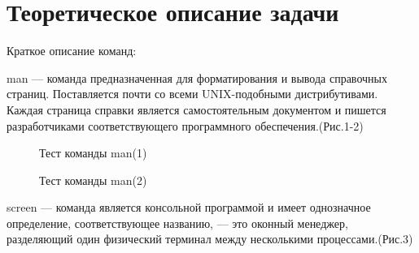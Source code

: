 \documentclass[a4paper,14pt]{extarticle}
\begin{document}
\section{Теоретическое описание задачи}
Краткое описание команд:

man — команда предназначенная для форматирования и вывода справочных страниц. Поставляется почти со всеми UNIX-подобными дистрибутивами. Каждая страница справки является самостоятельным документом и пишется разработчиками соответствующего программного обеспечения.(Рис.1-2)

\begin{figure}[h!]
\caption{Тест команды man(1)}
\label{fig:image}
\caption{Тест команды man(2)}
\label{fig:image}
\end{figure}

screen — команда является консольной программой и имеет однозначное определение, соответствующее названию, — это оконный менеджер, разделяющий один физический терминал между несколькими процессами.(Рис.3)
\end{document}

